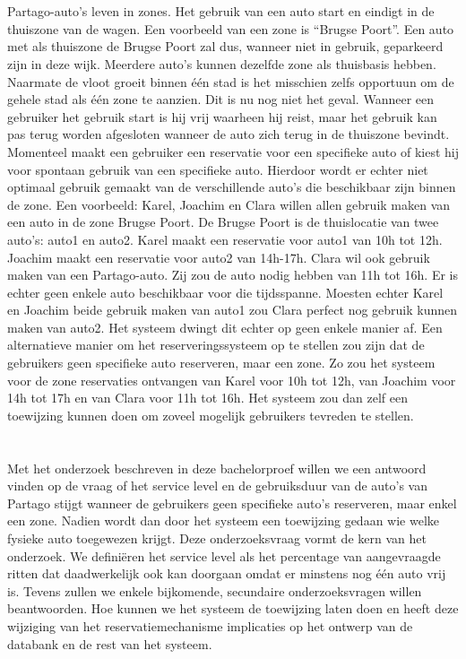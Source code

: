 \section{}
\label{sec:probleemstelling}
Partago-auto's leven in zones. Het gebruik van een auto start en eindigt in de thuiszone van de wagen. Een voorbeeld van een zone is ``Brugse Poort''. Een auto met als thuiszone de Brugse Poort zal dus, wanneer niet in gebruik, geparkeerd zijn in deze wijk. Meerdere auto's kunnen dezelfde zone als thuisbasis hebben. Naarmate de vloot groeit binnen één stad is het misschien zelfs opportuun om de gehele stad als één zone te aanzien. Dit is nu nog niet het geval. Wanneer een gebruiker het gebruik start is hij vrij waarheen hij reist, maar het gebruik kan pas terug worden afgesloten wanneer de auto zich terug in de thuiszone bevindt. Momenteel maakt een gebruiker een reservatie voor een specifieke auto of kiest hij voor spontaan gebruik van een specifieke auto. Hierdoor wordt er echter niet optimaal gebruik gemaakt van de verschillende auto's die beschikbaar zijn binnen de zone. Een voorbeeld: Karel, Joachim en Clara willen allen gebruik maken van een auto in de zone Brugse Poort. De Brugse Poort is de thuislocatie van twee auto's: auto1 en auto2. Karel maakt een reservatie voor auto1 van 10h tot 12h. Joachim maakt een reservatie voor auto2 van 14h-17h. Clara wil ook gebruik maken van een Partago-auto. Zij zou de auto nodig hebben van 11h tot 16h. Er is echter geen enkele auto beschikbaar voor die tijdsspanne. Moesten echter Karel en Joachim beide gebruik maken van auto1 zou Clara perfect nog gebruik kunnen maken van auto2. Het systeem dwingt dit echter op geen enkele manier af. Een alternatieve manier om het reserveringssysteem op te stellen zou zijn dat de gebruikers geen specifieke auto reserveren, maar een zone. Zo zou het systeem voor de zone reservaties ontvangen van Karel voor 10h tot 12h, van Joachim voor 14h tot 17h en van Clara voor 11h tot 16h. Het systeem zou dan zelf een toewijzing kunnen doen om zoveel mogelijk gebruikers tevreden te stellen.

\section{}
\label{sec:onderzoeksvraag}

Met het onderzoek beschreven in deze bachelorproef willen we een antwoord vinden op de vraag of het service level en de gebruiksduur van de auto's van Partago stijgt wanneer de gebruikers geen specifieke auto's reserveren, maar enkel een zone. Nadien wordt dan door het systeem een toewijzing gedaan wie welke fysieke auto toegewezen krijgt. Deze onderzoeksvraag vormt de kern van het onderzoek. We definiëren het service level als het percentage van aangevraagde ritten dat daadwerkelijk ook kan doorgaan omdat er minstens nog één auto vrij is. Tevens zullen we enkele bijkomende, secundaire onderzoeksvragen willen beantwoorden. Hoe kunnen we het systeem de toewijzing laten doen en heeft deze wijziging van het reservatiemechanisme implicaties op het ontwerp van de databank en de rest van het systeem.

